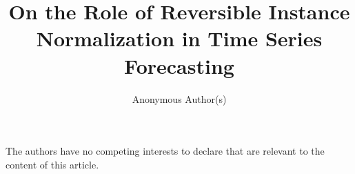 \documentclass[runningheads]{llncs}
\newcommand{\corr}{\textsuperscript{*}}
\begin{document}
\title{On the Role of Reversible Instance Normalization in Time Series Forecasting}

\newif\ifanonymous
\anonymoustrue %

\ifanonymous
  \author{Anonymous Author(s)}
\else
  \author{Gaspard Berthelier\inst{1,2} \corr \and
    Tahar Nabil\inst{1} \and
    Etienne Le Naour\inst{1} \and
    Richard Niamke\inst{1} \and
    Samir Perlaza\inst{2} \and
    Giovanni Neglia\inst{2}}
    \authorrunning{G. Berthelier et al.}

    \institute{EDF R\&D, France\\
    \email{\{gaspard.berthelier,tahar.nabil,etienne.le-naour,richard.niamke\}@edf.fr}
    \and
    Inria Sophia Antipolis, France\\
    \email{\{samir.perlaza,giovanni.neglia\}@inria.fr}}
\fi


\maketitle







\begin{credits}
\subsubsection{\discintname}
The authors have no competing interests to declare that are relevant to
the content of this article.
\end{credits}



\end{document}
